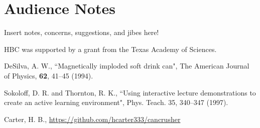 \documentclass[prb,preprint]{revtex4-1}
\begin{document}
\section{Audience Notes}
Insert notes, concerns, suggestions, and jibes here!

\begin{acknowledgments}
HBC was supported by a grant from the Texas Academy of Sciences.\end{acknowledgments}

\begin{thebibliography}{99}

 DeSilva, A. W., ``Magnetically imploded soft drink can", The American Journal of Physics, \textbf{62}, 41--45 (1994).  

 Sokoloff, D. R. and Thornton, R. K., ``Using interactive lecture demonstrations to create an active learning environment", Phys. Teach. 35, 340--347 (1997).  

 Carter, H. B., \url{https://github.com/hcarter333/cancrusher}


\end{thebibliography}



\end{document}
